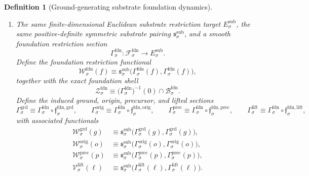 \documentclass[11pt]{article}
\newcommand{\SubTarget}[1]{E_{#1}^{\mathrm{sub}}}
\newcommand{\SubPair}[1]{\mathfrak s_{#1}^{\mathrm{sub}}}
\newcommand{\LiftSection}[1]{\Gamma_{#1}^{\mathrm{lift}}}
\newcommand{\LiftFunctional}[1]{\mathscr V_{#1}^{\mathrm{lift}}}
\newcommand{\PrecSection}[1]{\Gamma_{#1}^{\mathrm{prec}}}
\newcommand{\PrecFunctional}[1]{\mathscr W_{#1}^{\mathrm{prec}}}
\newcommand{\OrigSection}[1]{\Gamma_{#1}^{\mathrm{orig}}}
\newcommand{\OrigFunctional}[1]{\mathscr W_{#1}^{\mathrm{orig}}}
\newcommand{\GroundSection}[1]{\Gamma_{#1}^{\mathrm{grd}}}
\newcommand{\GroundFunctional}[1]{\mathscr W_{#1}^{\mathrm{grd}}}
\newcommand{\FoundSpace}[1]{\mathcal F_{#1}^{\mathrm{fdn}}}
\newcommand{\FoundBody}[1]{\mathcal B_{#1}^{\mathrm{fdn}}}
\newcommand{\FoundGroundMin}[1]{\mathfrak f_{#1}^{\mathrm{fdn,grd}}}
\newcommand{\FoundOrigMin}[1]{\mathfrak f_{#1}^{\mathrm{fdn,orig}}}
\newcommand{\FoundPrecMin}[1]{\mathfrak f_{#1}^{\mathrm{fdn,prec}}}
\newcommand{\FoundLiftMin}[1]{\mathfrak f_{#1}^{\mathrm{fdn,lift}}}
\newcommand{\FoundSection}[1]{\Gamma_{#1}^{\mathrm{fdn}}}
\newcommand{\FoundFunctional}[1]{\mathscr W_{#1}^{\mathrm{fdn}}}
\newcommand{\FoundShellSet}[1]{\mathcal Z_{#1}^{\mathrm{fdn}}}
\newtheorem{definition}{Definition}
\begin{document}
\begin{definition}[Ground-generating substrate foundation dynamics]
\begin{enumerate}
    \item The same finite-dimensional Euclidean substrate restriction target \(\SubTarget{\sigma}\), the same positive-definite symmetric substrate pairing \(\SubPair{\sigma}\), and a smooth foundation restriction section
    \[
    \FoundSection{\sigma}:\FoundSpace{\sigma}\to\SubTarget{\sigma}.
    \]
    Define the foundation restriction functional
    \begin{equation}
    \FoundFunctional{\sigma}(f)
    \equiv
    \SubPair{\sigma}\bigl(\FoundSection{\sigma}(f),\FoundSection{\sigma}(f)\bigr),
    \label{eq:foundfunctional}
    \end{equation}
    together with the exact foundation shell
    \begin{equation}
    \FoundShellSet{\sigma}
    \equiv
    \bigl(\FoundSection{\sigma}\bigr)^{-1}(0)\cap\FoundBody{\sigma}.
    \label{eq:foundshell}
    \end{equation}
    Define the induced ground, origin, precursor, and lifted sections
    \begin{equation}
    \GroundSection{\sigma}
    \equiv
    \FoundSection{\sigma}\circ\FoundGroundMin{\sigma},
    \qquad
    \OrigSection{\sigma}
    \equiv
    \FoundSection{\sigma}\circ\FoundOrigMin{\sigma},
    \qquad
    \PrecSection{\sigma}
    \equiv
    \FoundSection{\sigma}\circ\FoundPrecMin{\sigma},
    \qquad
    \LiftSection{\sigma}
    \equiv
    \FoundSection{\sigma}\circ\FoundLiftMin{\sigma},
    \label{eq:foundinducedsections}
    \end{equation}
    with associated functionals
    \begin{equation}
    \begin{aligned}
    \GroundFunctional{\sigma}(g)
    &\equiv
    \SubPair{\sigma}\bigl(\GroundSection{\sigma}(g),\GroundSection{\sigma}(g)\bigr),
    \\
    \OrigFunctional{\sigma}(o)
    &\equiv
    \SubPair{\sigma}\bigl(\OrigSection{\sigma}(o),\OrigSection{\sigma}(o)\bigr),
    \\
    \PrecFunctional{\sigma}(p)
    &\equiv
    \SubPair{\sigma}\bigl(\PrecSection{\sigma}(p),\PrecSection{\sigma}(p)\bigr),
    \\
    \LiftFunctional{\sigma}(\ell)
    &\equiv
    \SubPair{\sigma}\bigl(\LiftSection{\sigma}(\ell),\LiftSection{\sigma}(\ell)\bigr).
    \end{aligned}
    \label{eq:foundinducedfunctionals}
    \end{equation}

\end{enumerate}
\end{definition}
\end{document}
